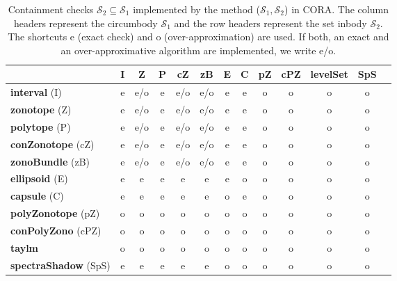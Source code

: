 \begin{table}[htb]
	\centering
	\footnotesize
	\caption{Containment checks $\mathcal{S}_2 \subseteq \mathcal{S}_1$ implemented by the method ($\mathcal{S}_1,\mathcal{S}_2$) in CORA. The column headers represent the circumbody $\mathcal{S}_1$ and the row headers represent the set inbody $\mathcal{S}_2$. The shortcuts e (exact check) and o (over-approximation) are used. If both, an exact and an over-approximative algorithm are implemented, we write e/o.}
	\label{tab:in}
	\begin{tabular}{ l c c c c c c c c c c c c}
		\toprule
					 & \textbf{I} & \textbf{Z} & \textbf{P} & \textbf{cZ} & \textbf{zB} & \textbf{E} & \textbf{C} & \textbf{pZ} & \textbf{cPZ} & \textbf{levelSet} & \textbf{SpS}\\
		\midrule
		\textbf{interval} (I)       		  & e & e/o & e & e/o & e/o & e	& e & o & o & o & o\\
		\textbf{zonotope} (Z)      		    & e & e/o & e & e/o & e/o & e	& e & o & o & o & o\\
		\textbf{polytope} (P)   	        & e & e/o & e & e/o & e/o & e	& e & o & o & o & o\\
		\textbf{conZonotope} (cZ)		      & e & e/o & e & e/o & e/o & e	& e & o & o & o & o\\
		\textbf{zonoBundle} (zB)  	      	  & e & e/o & e & e/o & e/o & e	& e & o & o & o & o\\
		\textbf{ellipsoid} (E)       	      & e & e   & e & e   & e   & e & o & o & o & o & o\\
		\textbf{capsule} (C)				  & e & e   & e & e   & e   & o	& e & o & o & o & o\\
		\textbf{polyZonotope} (pZ)		 	  & o & o   & o & o   & o   & o	& o & o & o & o & o\\
		\textbf{conPolyZono} (cPZ)			  & o & o   & o & o   & o   & o	& o & o & o & o & o\\
		\textbf{taylm}     	                  & o & o   & o & o   & o   & o	& o & o & o & o & o\\
		\textbf{spectraShadow} (SpS)		  & e & e   & e & e   & e   & o & o & o & o & o & o\\
		\bottomrule
	\end{tabular}
\end{table}




